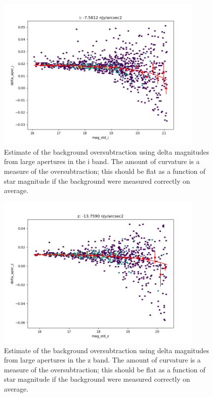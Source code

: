\begin{figure}
  \begin{center}
    \includegraphics[width=0.9\textwidth]{photometric_calibration_figures/background_oversubtraction_i.png}
  \end{center}
  \caption{Estimate of the background oversubtraction using delta magnitudes
    from large apertures in the i band.  The amount of curvature is a measure
    of the oversubtraction; this should be flat as a function of star magnitude
    if the background were measured correctly on average.}
\end{figure}

\begin{figure}
  \begin{center}
    \includegraphics[width=0.9\textwidth]{photometric_calibration_figures/background_oversubtraction_z.png}
  \end{center}
  \caption{Estimate of the background oversubtraction using delta magnitudes
    from large apertures in the z band.  The amount of curvature is a measure
    of the oversubtraction; this should be flat as a function of star magnitude
    if the background were measured correctly on average.}
\end{figure}

